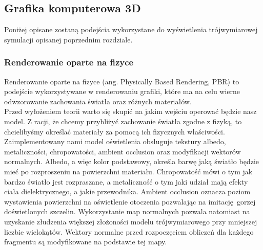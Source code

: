 \subsection{Grafika komputerowa 3D}

Poniżej opisane zostaną podejścia wykorzystane do wyświetlenia trójwymiarowej symulacji opisanej poprzednim rozdziale.

\subsubsection{Renderowanie oparte na fizyce}

Renderowanie oparte na fizyce (ang. Physically Based Rendering, PBR) to podejście wykorzystywane w renderowaniu grafiki, które ma na celu wierne odwzorowanie zachowania światła oraz różnych materiałów.
\\

Przed wyłożeniem teorii warto się skupić na jakim wejściu operować będzie nasz model. Z racji, że chcemy przybliżyć zachowanie światła zgodne z fizyką, to chcielibyśmy określać materiały za pomocą ich fizycznych właściwości. Zaimplementowany nami model oświetlenia obsługuje tekstury albedo, metaliczności, chropowatości, ambient occlusion oraz modyfikacji wektorów normalnych.
Albedo, a więc kolor podstawowy, określa barwę jaką światło będzie mieć po rozproszeniu na powierzchni materiału. Chropowatość mówi o tym jak bardzo światło jest rozpraszane, a  metaliczność o tym jaki udział mają efekty ciała dielektrycznego, a jakie przewodnika. Ambient occlusion oznacza poziom wystawienia powierzchni na oświetlenie otoczenia pozwalając na imitację gorzej doświetlonych szczelin. Wykorzystanie map normalnych pozwala natomiast na uzyskanie złudzenia większej złożoności modelu trójwymiarowego przy mniejszej liczbie wielokątów. Wektory normalne przed rozpoczęciem obliczeń dla każdego fragmentu są modyfikowane na podstawie tej mapy.
\\

